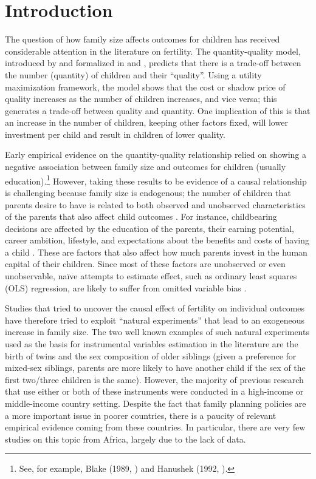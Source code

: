 
\section{Introduction}

The question of how family size affects outcomes for children has received considerable attention in the literature on fertility. The quantity-quality model, introduced by \textcite{Becker1960} and formalized in \textcite{Becker1973} and \textcite{Becker1976}, predicts that there is a trade-off between the number (quantity) of children and their “quality”. Using a utility maximization framework, the model shows that the cost or shadow price of quality increases as the number of children increases, and vice versa; this generates a trade-off between quality and quantity. One implication of this is that an increase in the number of children, keeping other factors fixed, will lower investment per child and result in children of lower quality.

Early empirical evidence on the quantity-quality relationship relied on showing a negative association between family size and outcomes for children (usually education).\footnote{See, for example, Blake (1989, \cite[cited in][]{Black2010}) and Hanushek (1992, \cite[cited in][]{angrist_multiple_2010}).}  However, taking these results to be evidence of a causal relationship is challenging because family size is endogenous; the number of children that parents desire to have is related to both observed and unobserved characteristics of the parents that also affect child outcomes \parencite{Black2010}. For instance, childbearing decisions are affected by the education of the parents, their earning potential, career ambition, lifestyle, and expectations about the benefits and costs of having a child \parencite{Angrist2006,oberg_casual_2021}. These are factors that also affect how much parents invest in the human capital of their children. Since most of these factors are unobserved or even unobservable, naïve attempts to estimate effect, such as ordinary least squares (OLS) regression, are likely to suffer from omitted variable bias \parencite{oberg_casual_2021}.

Studies that tried to uncover the causal effect of fertility on individual outcomes have therefore tried to exploit “natural experiments” that lead to an exogeneous increase in family size. The two well known examples of such natural experiments used as the basis for instrumental variables estimation in the literature are the birth of twins and the sex composition of older siblings (given a preference for mixed-sex siblings, parents are more likely to have another child if the sex of the first two/three children is the same). However, the majority of previous research that use either or both of these instruments were conducted in a high-income or middle-income country setting. Despite the fact that family planning policies are a more important issue in poorer countries, there is a paucity of relevant empirical evidence coming from these countries. In particular, there are very few studies on this topic from Africa, largely due to the lack of data. 

